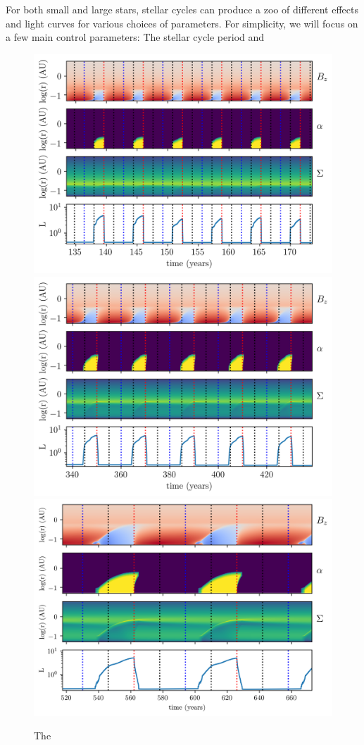 For both small and large stars, stellar cycles can produce a zoo of different effects and light curves for various choices of parameters. For simplicity, we will focus on a few main control parameters: The stellar cycle period and 

\begin{figure}[p]
\centering
\includegraphics[width=0.7\columnwidth]{figs/figsChapter3/run10241/MST1_short.png}
\includegraphics[width=0.7\columnwidth]{figs/figsChapter3/run10242/MST1_short.png}
\includegraphics[width=0.7\columnwidth]{figs/figsChapter3/run10243/MST1_short.png}
\caption{The}
\label{fiStExample}
\end{figure}
 
